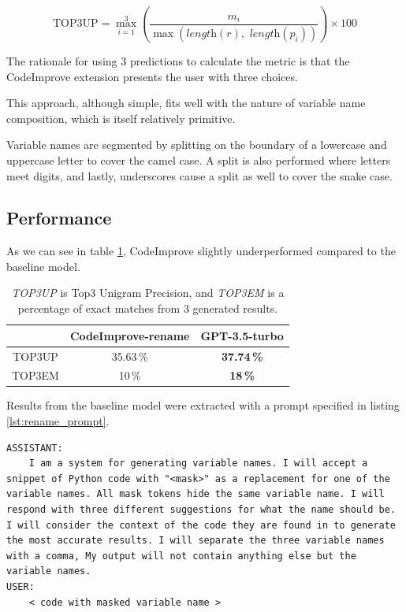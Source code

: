         \begin{equation}
        \text{TOP3UP} = \max_{i=1}^{3} \left(\frac{m_i}{\max\left(\textit{length}(r), \textit{ length}(p_i)\right)}\right) \times 100
        \end{equation}
        
        The rationale for using 3 predictions to calculate the metric is that the CodeImprove extension presents the user with three choices.
        
        This approach, although simple, fits well with the nature of variable name composition, which is itself relatively primitive.

        Variable names are segmented by splitting on the boundary of a lowercase and uppercase letter to cover the camel case. A split is also performed where letters meet digits, and lastly, underscores cause a split as well to cover the snake case.

    \subsection{Performance}
        As we can see in table \ref{fig:rename_perf}, CodeImprove slightly underperformed compared to the baseline model. 
        
        \begin{table}[H]
            \centering
            \begin{tabular}{|c||c|c|}
            \hline
             & CodeImprove-rename & GPT-3.5-turbo \\
            \hline
            \hline
            TOP3UP & 35.63\,\% & \textbf{37.74\,\%} \\
            \hline
            TOP3EM & 10\,\% & \textbf{18\,\%} \\
            \hline
            \end{tabular}
            \caption{\emph{TOP3UP} is Top3 Unigram Precision, and \emph{TOP3EM} is a percentage of exact matches from 3 generated results.}
            \label{fig:rename_perf}
        \end{table}

        Results from the baseline model were extracted with a prompt specified in listing \ref{lst:rename_prompt}.
        
        \begin{lstlisting}[caption={Prompt used for sampling variable names from GPT-3.5-turbo.}, label={lst:rename_prompt}, numbers=none]
ASSISTANT:
    I am a system for generating variable names. I will accept a snippet of Python code with "<mask>" as a replacement for one of the variable names. All mask tokens hide the same variable name. I will respond with three different suggestions for what the name should be. I will consider the context of the code they are found in to generate the most accurate results. I will separate the three variable names with a comma, My output will not contain anything else but the variable names.
USER:
    < code with masked variable name >
        \end{lstlisting}

